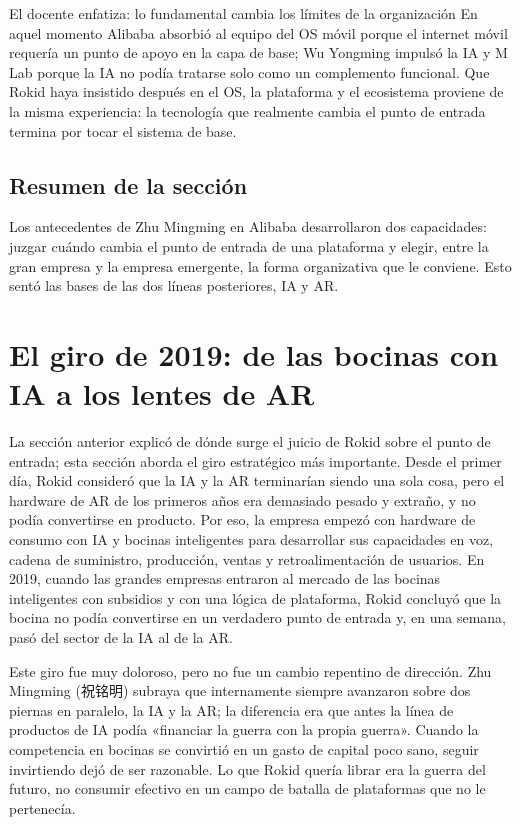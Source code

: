 \documentclass[a4paper]{article}
\begin{document}
\begin{importantbox}{El docente enfatiza: lo fundamental cambia los límites de la organización}
En aquel momento Alibaba absorbió al equipo del OS móvil porque el internet móvil requería un punto de apoyo en la capa de base; Wu Yongming impulsó la IA y M Lab porque la IA no podía tratarse solo como un complemento funcional. Que Rokid haya insistido después en el OS, la plataforma y el ecosistema proviene de la misma experiencia: la tecnología que realmente cambia el punto de entrada termina por tocar el sistema de base.
\end{importantbox}

\subsection{Resumen de la sección}

Los antecedentes de Zhu Mingming en Alibaba desarrollaron dos capacidades: juzgar cuándo cambia el punto de entrada de una plataforma y elegir, entre la gran empresa y la empresa emergente, la forma organizativa que le conviene. Esto sentó las bases de las dos líneas posteriores, IA y AR.
\section{El giro de 2019: de las bocinas con IA a los lentes de AR}

La sección anterior explicó de dónde surge el juicio de Rokid sobre el punto de entrada; esta sección aborda el giro estratégico más importante. Desde el primer día, Rokid consideró que la IA y la AR terminarían siendo una sola cosa, pero el hardware de AR de los primeros años era demasiado pesado y extraño, y no podía convertirse en producto. Por eso, la empresa empezó con hardware de consumo con IA y bocinas inteligentes para desarrollar sus capacidades en voz, cadena de suministro, producción, ventas y retroalimentación de usuarios. En 2019, cuando las grandes empresas entraron al mercado de las bocinas inteligentes con subsidios y con una lógica de plataforma, Rokid concluyó que la bocina no podía convertirse en un verdadero punto de entrada y, en una semana, pasó del sector de la IA al de la AR.

Este giro fue muy doloroso, pero no fue un cambio repentino de dirección. Zhu Mingming (祝铭明) subraya que internamente siempre avanzaron sobre dos piernas en paralelo, la IA y la AR; la diferencia era que antes la línea de productos de IA podía «financiar la guerra con la propia guerra». Cuando la competencia en bocinas se convirtió en un gasto de capital poco sano, seguir invirtiendo dejó de ser razonable. Lo que Rokid quería librar era la guerra del futuro, no consumir efectivo en un campo de batalla de plataformas que no le pertenecía.
\end{document}
